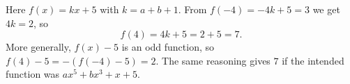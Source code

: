Here $f(x)=kx+5$ with $k=a+b+1$. From $f(-4)=-4k+5=3$ we get $4k=2$, so
\[
f(4)=4k+5=2+5=\boxed{7}.
\]
More generally, $f(x)-5$ is an odd function, so $f(4)-5=-(f(-4)-5)=2$. The same reasoning gives $7$ if the intended function was $ax^5+bx^3+x+5$.
